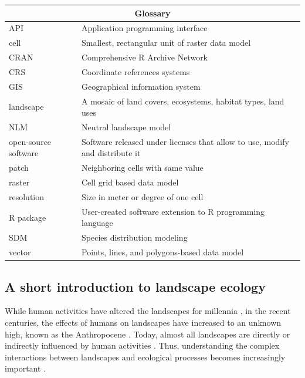 \documentclass[smallextended]{svjour3}       %
\begin{document}
\begin{tabularx}{450pt}{lX}

\hline

\multicolumn{2}{c}{Glossary} \\

\hline

API & Application programming interface \\
cell & Smallest, rectangular unit of raster data model \\
CRAN & Comprehensive R Archive Network \\
CRS & Coordinate references systems \\
GIS & Geographical information system \\
landscape & A mosaic of land covers, ecosystems, habitat types, land uses \\
NLM & Neutral landscape model \\
open-source software & Software released under licenses that allow to use, modify and distribute it \\
patch & Neighboring cells with same value \\
raster & Cell grid based data model \\
resolution & Size in meter or degree of one cell \\
R package & User-created software extension to R programming language \\
SDM & Species distribution modeling \\
vector & Points, lines, and polygons-based data model \\

\hline

\end{tabularx}

\hypertarget{sec:landscape_ecology}{%
\subsection{A short introduction to landscape ecology}\label{sec:landscape_ecology}}

While human activities have altered the landscapes for millennia \cite{Ellis2011,Ellis2015}, in the recent centuries, the effects of humans on landscapes have increased to an unknown high, known as the Anthropocene \cite{Crutzen2002}.
Today, almost all landscapes are directly or indirectly influenced by human activities \cite{Vitousek1997}.
Thus, understanding the complex interactions between landscapes and ecological processes becomes increasingly important \cite{With2019}.
\end{document}
